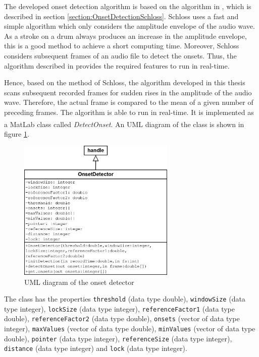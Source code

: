 The developed onset detection algorithm is based on the algorithm in \autocite{Schloss:1985}, which is described in section \ref{section:OnsetDetectionSchloss}. Schloss uses a fast and simple algorithm which only considers the amplitude envelope of the audio wave. As a stroke on a drum always produces an increase in the amplitude envelope, this is a good method to achieve a short computing time. Moreover, Schloss considers subsequent frames of an audio file to detect the onsets. Thus, the algorithm described in \autocite{Schloss:1985} provides the required features to run in real-time.

Hence, based on the method of Schloss, the algorithm developed in this thesis scans subsequent recorded frames for sudden rises in the amplitude of the audio wave. Therefore, the actual frame is compared to the mean of a given number of preceding frames. The algorithm is able to run in real-time. It is implemented as a MatLab\textsuperscript{\textregistered} class called \textit{DetectOnset}. An UML diagram of the class is shown in figure \ref{fig:onsetDetectorUML}.

\begin{figure}[htb]
	\centering
	\includegraphics[width=7.5cm]{images/UML/onsetDetectorUML.png}
	\caption{UML diagram of the onset detector}
	\label{fig:onsetDetectorUML}
\end{figure}

The class has the properties \lstinline{threshold} (data type double), \lstinline{windowSize} (data type integer), \lstinline{lockSize} (data type integer), \lstinline{referenceFactor1} (data type double), \lstinline{referenceFactor2} (data type double), \lstinline{onsets} (vector of data type integer), \lstinline{maxValues} (vector of data type double), \lstinline{minValues} (vector of data type double), \lstinline{pointer} (data type integer), \lstinline{referenceSize} (data type integer), \lstinline{distance} (data type integer) and \lstinline{lock} (data type integer).

